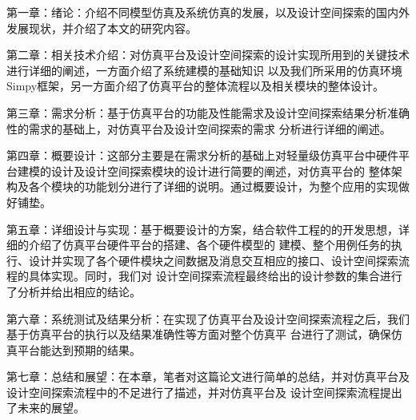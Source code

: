 第一章：绪论：介绍不同模型仿真及系统仿真的发展，以及设计空间探索的国内外发展现状，并介绍了本文的研究内容。

第二章：相关技术介绍：对仿真平台及设计空间探索的设计实现所用到的关键技术进行详细的阐述，一方面介绍了系统建模的基础知识
以及我们所采用的仿真环境Simpy框架，另一方面介绍了仿真平台的整体流程以及相关模块的整体设计。

第三章：需求分析：基于仿真平台的功能及性能需求及设计空间探索结果分析准确性的需求的基础上，对仿真平台及设计空间探索的需求
分析进行详细的阐述。

第四章：概要设计：这部分主要是在需求分析的基础上对轻量级仿真平台中硬件平台建模的设计及设计空间探索模块的设计进行简要的阐述，对仿真平台的
整体架构及各个模块的功能划分进行了详细的说明。通过概要设计，为整个应用的实现做好铺垫。

第五章：详细设计与实现：基于概要设计的方案，结合软件工程的的开发思想，详细的介绍了仿真平台硬件平台的搭建、各个硬件模型的
建模、整个用例任务的执行、设计并实现了各个硬件模块之间数据及消息交互相应的接口、设计空间探索流程的具体实现。同时，我们对
设计空间探索流程最终给出的设计参数的集合进行了分析并给出相应的结论。

第六章：系统测试及结果分析：在实现了仿真平台及设计空间探索流程之后，我们基于仿真平台的执行以及结果准确性等方面对整个仿真平
台进行了测试，确保仿真平台能达到预期的结果。

第七章：总结和展望：在本章，笔者对这篇论文进行简单的总结，并对仿真平台及设计空间探索流程中的不足进行了描述，并对仿真平台及
设计空间探索流程提出了未来的展望。

